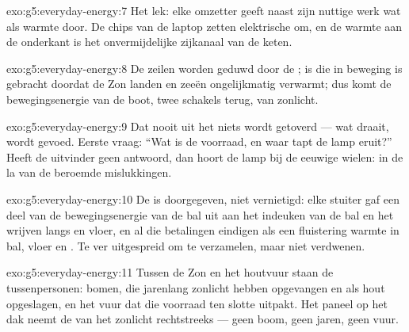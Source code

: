 \begin{solution}{exo:g5:everyday-energy:7}
Het lek: elke omzetter geeft naast zijn nuttige werk wat
 als warmte door. De chips van de laptop zetten elektrische
 om, en de warmte aan de onderkant is het onvermijdelijke
zijkanaal van de keten.
\end{solution}

\begin{solution}{exo:g5:everyday-energy:8}
De zeilen worden geduwd door de ;  is  die in
beweging is gebracht doordat de Zon landen en zeeën ongelijkmatig
verwarmt; dus komt de bewegingsenergie van de boot, twee schakels
terug, van zonlicht.
\end{solution}

\begin{solution}{exo:g5:everyday-energy:9}
Dat  nooit uit het niets wordt getoverd --- wat draait, wordt
gevoed. Eerste vraag: ``Wat is de voorraad, en waar tapt de lamp
eruit?'' Heeft de uitvinder geen antwoord, dan hoort de lamp bij de
eeuwige wielen: in de la van de beroemde mislukkingen.
\end{solution}

\begin{solution}{exo:g5:everyday-energy:10}
De  is doorgegeven, niet vernietigd: elke stuiter gaf een deel
van de bewegingsenergie van de bal uit aan het indeuken van de bal en
het wrijven langs  en vloer, en al die betalingen eindigen als een
fluistering warmte in bal, vloer en . Te ver uitgespreid om te
verzamelen, maar niet verdwenen.
\end{solution}

\begin{solution}{exo:g5:everyday-energy:11}
Tussen de Zon en het houtvuur staan de tussenpersonen: bomen, die
jarenlang zonlicht hebben opgevangen en als hout opgeslagen, en het
vuur dat die voorraad ten slotte uitpakt. Het paneel op het dak neemt
de  van het zonlicht rechtstreeks --- geen boom, geen jaren,
geen vuur.
\end{solution}
